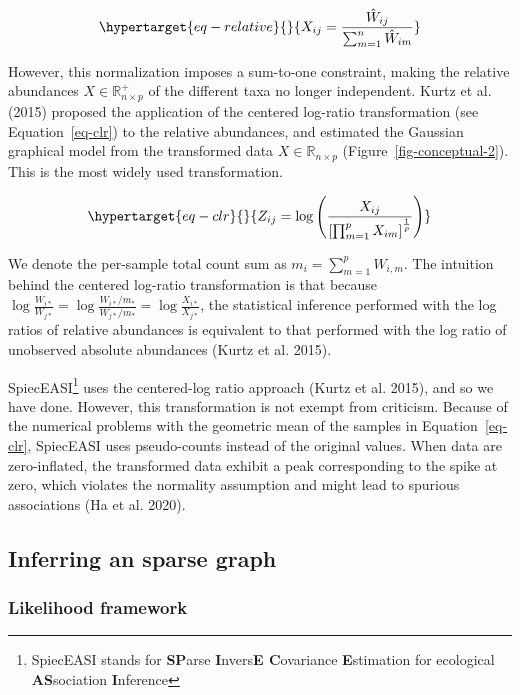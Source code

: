 \documentclass[
  a4paper,
]{article}
\begin{document}
\begin{equation}\protect\hypertarget{eq-relative}{}{
X_{ij} = \frac{\hat W_{ij}}{\sum_{m=1}^n \hat W_{im}}
}\label{eq-relative}\end{equation}

However, this normalization imposes a sum-to-one constraint, making the
relative abundances \(X \in \mathbb R^+_{n\times p}\) of the different
taxa no longer independent. Kurtz et al. (2015) proposed the application
of the centered log-ratio transformation (see Equation~\ref{eq-clr}) to
the relative abundances, and estimated the Gaussian graphical model from
the transformed data \(X \in \mathbb R_{n\times p}\)
(Figure~\ref{fig-conceptual-2}). This is the most widely used
transformation.

\begin{equation}\protect\hypertarget{eq-clr}{}{
Z_{ij} = \log \left (\frac{X_{ij}}{\left [ \prod_{m=1}^pX_{im}\right]^{\frac 1 p}}\right )
}\label{eq-clr}\end{equation}

We denote the per-sample total count sum as
\(m_i = \sum_{m=1}^p W_{i,m}\). The intuition behind the centered
log-ratio transformation is that because
\(\log{\frac {W_{i*}}{W_{j*}}} = \log{\frac {W_{i*}/m_*}{W_{j*}/m_*}} = \log{\frac {X_{i*}}{X_{j*}}}\),
the statistical inference performed with the log ratios of relative
abundances is equivalent to that performed with the log ratio of
unobserved absolute abundances (Kurtz et al. 2015).

SpiecEASI\footnote{SpiecEASI stands for \textbf{SP}arse
  \textbf{I}nvers\textbf{E C}ovariance \textbf{E}stimation for
  ecological \textbf{AS}sociation \textbf{I}nference} uses the
centered-log ratio approach (Kurtz et al. 2015), and so we have done.
However, this transformation is not exempt from criticism. Because of
the numerical problems with the geometric mean of the samples in
Equation~\ref{eq-clr}, SpiecEASI uses pseudo-counts instead of the
original values. When data are zero-inflated, the transformed data
exhibit a peak corresponding to the spike at zero, which violates the
normality assumption and might lead to spurious associations (Ha et al.
2020).

\hypertarget{inferring-an-sparse-graph}{%
\subsection{Inferring an sparse graph}\label{inferring-an-sparse-graph}}

\hypertarget{likelihood-framework}{%
\subsubsection{Likelihood framework}\label{likelihood-framework}}
\end{document}
